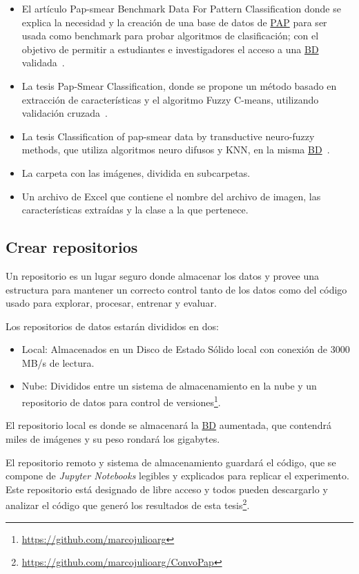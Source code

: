 \begin{itemize}
    \item El artículo Pap-smear Benchmark Data For Pattern Classification donde se explica
    la necesidad y la creación de una base de datos de \hyperlink{abbr}{PAP} para ser usada como benchmark
    para probar algoritmos de clasificación; con el objetivo de permitir a estudiantes e investigadores
    el acceso a una \hyperlink{abbr}{BD} validada~\cite{Jantzen2005}.
    \item La tesis Pap-Smear Classification, donde se propone un método basado en extracción
    de características y el algoritmo Fuzzy C-means, utilizando validación cruzada~\cite{Martin2003}.
    \item La tesis Classification of pap-smear data by transductive neuro-fuzzy
    methods, que utiliza algoritmos neuro difusos y KNN, en la misma \hyperlink{abbr}{BD}~\cite{Norup2005}.
    \item La carpeta con las imágenes, dividida en subcarpetas.
    \item Un archivo de Excel que contiene el nombre del archivo de imagen, las características
    extraídas y la clase a la que pertenece.
\end{itemize}

\subsection{Crear repositorios}

Un repositorio es un lugar seguro donde almacenar los datos y provee una
estructura para mantener un correcto control tanto de los datos como del código
usado para explorar, procesar, entrenar y evaluar.

Los repositorios de datos estarán divididos en dos: 

\begin{itemize}
    \item{Local:} Almacenados en un Disco de Estado Sólido local con conexión de
    3000 MB/s de lectura.
    \item{Nube:} Divididos entre un sistema de almacenamiento en la nube y un repositorio
    de datos para control de versiones\footnote{\url{https://github.com/marcojulioarg}}.
\end{itemize}

El repositorio local es donde se almacenará la \hyperlink{abbr}{BD} aumentada,
que contendrá miles de imágenes y su peso rondará los gigabytes.

El repositorio remoto y sistema de almacenamiento guardará el código, que se
compone de \emph{Jupyter Notebooks} legibles y explicados para replicar el
experimento. Este repositorio está designado de libre acceso y todos pueden
descargarlo y analizar el código que generó los resultados de esta tesis\footnote{\url{https://github.com/marcojulioarg/ConvoPap}}.

